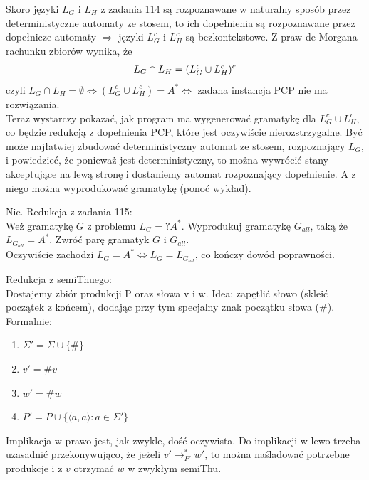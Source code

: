 \documentclass[a4paper,11pt]{article}
\newenvironment{zadanie}[1]
  {\renewcommand\theinnercustomthm{#1}\innercustomthm}
  {\endinnercustomthm}
\begin{document}
\begin{zadanie}{115}
\end{zadanie}
Skoro języki $L_G$ i $L_H$ z zadania 114 są rozpoznawane w naturalny sposób przez deterministyczne automaty ze stosem,
to ich dopełnienia są rozpoznawane przez dopełnicze automaty $\Rightarrow$ języki $L_G^c$ i $L_H^c$ są bezkontekstowe. 
Z praw de Morgana rachunku zbiorów wynika, że
\begin{align}
 L_G \cap L_H = (L_G^c \cup L_H^c)^c \notag
\end{align}
czyli $L_G \cap L_H = \emptyset  \Longleftrightarrow (L_G^c \cup L_H^c) = A^* \Longleftrightarrow $ zadana instancja PCP 
nie ma rozwiązania. \\
Teraz wystarczy pokazać, jak program ma wygenerować gramatykę dla $L_G^c \cup L_H^c$, co będzie redukcją z dopełnienia PCP,
które jest oczywiście nierozstrzygalne. Być może najłatwiej zbudować deterministyczny automat ze stosem, rozpoznający $L_G$,
i powiedzieć, że ponieważ jest deterministyczny, to można wywrócić stany akceptujące na lewą stronę i dostaniemy automat rozpoznający
dopełnienie. A z niego można wyprodukować gramatykę (ponoć wykład).

\begin{zadanie}{116}
\end{zadanie}
Nie. Redukcja z zadania 115: \\
Weż gramatykę $G$ z problemu $L_G =? A^*$. Wyprodukuj gramatykę $G_{all}$, taką że $L_{G_{all}} = A^*$. Zwróć parę gramatyk
$G$ i $G_{all}$. \\
Oczywiście zachodzi $L_G = A^* \Longleftrightarrow L_G = L_{G_{all}}$, co kończy dowód poprawności.

\begin{zadanie}{118}
\end{zadanie}
Redukcja z semiThuego: \\
Dostajemy zbiór produkcji P oraz słowa v i w. Idea: zapętlić słowo (skleić początek z końcem), dodając przy tym specjalny
znak początku słowa ($\#$). Formalnie:
\begin{enumerate}
 \item $\Sigma' = \Sigma \cup \{ \# \}$
 \item $v' = \# v$
 \item $w' = \# w$
 \item $P' = P \cup \{ \langle a , a \rangle : a \in \Sigma' \}$
\end{enumerate}
Implikacja w prawo jest, jak zwykle, dość oczywista. Do implikacji w lewo trzeba uzasadnić przekonywująco, że jeżeli 
$v' \longrightarrow_{P'}^* w'$, to można naśladować potrzebne produkcje i z $v$ otrzymać $w$ w zwykłym semiThu. 
\end{document}
